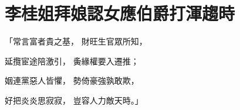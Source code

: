 %

\chapter{李桂姐拜娘認女\KG 應伯爵打渾趨時}


\begin{showcontents}{}



「常言富者貴之基，  財旺生官眾所知，

延攬宦途陪激引，  夤緣權要入遷推；

姻連黨惡人皆懼，  勢倚豪強孰敢欺，

好把炎炎思寂寂，  豈容人力敵天時。」


\end{showcontents}
